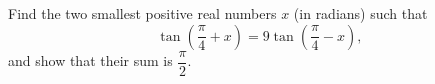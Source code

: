 Find the two smallest positive real numbers $x$ (in radians) such that
\[\tan\left(\dfrac{\pi}{4}+x\right)=9\tan\left(\dfrac{\pi}{4}-x\right),\]
and show that their sum is $\dfrac{\pi}{2}$.

